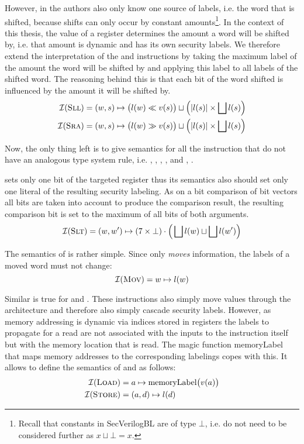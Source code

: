 However, in \cite{Ferraiuolo17} the authors also only know one source of labels, i.e. the word that is shifted, because shifts can only occur by constant amounts\footnote{%
    Recall that constants in SecVerilogBL are of type $ \bot $, i.e. do not need to be considered further as $ x \sqcup \bot = x $.
}.
In the context of this thesis, the value of a register determines the amount a word will be shifted by, i.e. that amount is dynamic and has its own security labels.
We therefore extend the interpretation of the  and  instructions by taking the maximum label of the amount the word will be shifted by and applying this label to all labels of the shifted word.
The reasoning behind this is that each bit of the word shifted is influenced by the amount it will be shifted by.
\begin{align*}
    \mathcal{I}(\textsc{Sll}) &= (w, s) \mapsto \big(l(w) \ll v(s) \big) \sqcup \Big(|l(s)| \times \bigsqcup l(s) \Big) \\
    \mathcal{I}(\textsc{Sra}) &= (w, s) \mapsto \big(l(w) \gg v(s) \big) \sqcup \Big(|l(s)| \times \bigsqcup l(s) \Big)
\end{align*}

Now, the only thing left is to give semantics for all the instruction that do not have an analogous type system rule, i.e. , , , ,  and , .

 sets only one bit of the targeted register thus its semantics also should set only one literal of the resulting security labeling.
As on a bit comparison of bit vectors all bits are taken into account to produce the comparison result, the resulting comparison bit is set to the maximum of all bits of both arguments.
\begin{equation*}
    \mathcal{I}(\textsc{Slt}) = (w, w') \mapsto (7 \times \bot) \cdot \Big(\bigsqcup l(w) \sqcup \bigsqcup l(w') \Big)
\end{equation*}

The semantics of  is rather simple.
Since  only \textit{moves} information, the labels of a moved word must not change:
\begin{equation*}
    \mathcal{I}(\textsc{Mov}) = w \mapsto l(w)
\end{equation*}

Similar is true for  and .
These instructions also simply move values through the architecture and therefore also simply cascade security labels.
However, as memory addressing is dynamic via indices stored in registers the labels to propagate for a read are not associated with the inputs to the instruction itself but with the memory location that is read.
The magic function \mbox{memoryLabel} that maps memory addresses to the corresponding labelings copes with this.
It allows to define the semantics of  and  as follows:
\begin{align*}
    \mathcal{I}(\textsc{Load}) &= a \mapsto \text{memoryLabel}\big(v(a) \big) \\
    \mathcal{I}(\textsc{Store}) &= (a, d) \mapsto l(d)
\end{align*}

